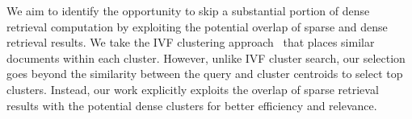 We aim to identify the opportunity to skip a substantial portion of dense retrieval computation 
by exploiting the potential overlap of sparse and  dense retrieval results.
We take the IVF clustering approach~\cite{johnson2019billion} that  places similar documents within each cluster. 
However, unlike IVF cluster search, our selection goes beyond the similarity between the query and cluster centroids to select top clusters.
Instead, our work explicitly exploits the overlap of sparse retrieval results with the potential dense clusters for better efficiency and relevance.   


